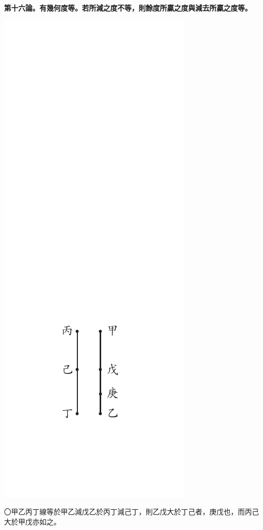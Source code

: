 \documentclass[12pt,b5paper,landscape]{article}
\newcommand{\bcom}[1]{〇#1}
\newcommand{\cthm}[1]{{
\vspace{8pt}

\bfseries #1}}
\begin{document}
\begin{multicols}{2}
\cthm{第十六論。有幾何度等。若所減之度不等，則餘度所贏之度與減去所贏之度等。}
\begin{center}
\includegraphics[angle=90]{eu33}
\end{center}
\bcom{甲乙丙丁線等於甲乙減戊乙於丙丁減己丁，則乙戊大於丁己者，庚戊也，而丙己大於甲戊亦如之。}


\end{multicols}
\end{document}
